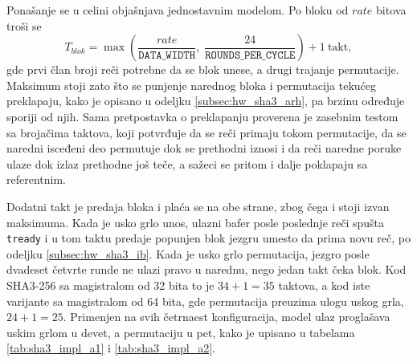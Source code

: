 \begin{table}[H]
\caption{Izmerena vrednost bita po taktu i propusnost izvedena iz nje pri $F_{max}$ iz tabela \ref{tab:sha3_impl_a1} i \ref{tab:sha3_impl_a2}}
\centering
{}
\label{tab:sha3_bpc}
\end{table}

Ponašanje se u celini objašnjava jednostavnim modelom. Po bloku od $rate$ bitova troši se
\begin{equation}
    T_{blok} = \max\!\left(\frac{rate}{\texttt{DATA\_WIDTH}},\; \frac{24}{\texttt{ROUNDS\_PER\_CYCLE}}\right) + 1 \ \text{takt},
    \label{eq:sha3_model}
\end{equation}
gde prvi član broji reči potrebne da se blok unese, a drugi trajanje permutacije. Maksimum stoji zato što se punjenje narednog bloka i permutacija tekućeg preklapaju, kako je opisano u odeljku \ref{subsec:hw_sha3_arh}, pa brzinu određuje sporiji od njih. Sama pretpostavka o preklapanju proverena je zasebnim testom sa brojačima taktova, koji potvrđuje da se reči primaju tokom permutacije, da se naredni isceđeni deo permutuje dok se prethodni iznosi i da reči naredne poruke ulaze dok izlaz prethodne još teče, a sažeci se pritom i dalje poklapaju sa referentnim.

Dodatni takt je predaja bloka i plaća se na obe strane, zbog čega i stoji izvan maksimuma. Kada je usko grlo unos, ulazni bafer posle poslednje reči spušta \texttt{tready} i u tom taktu predaje popunjen blok jezgru umesto da prima novu reč, po odeljku \ref{subsec:hw_sha3_ib}. Kada je usko grlo permutacija, jezgro posle dvadeset četvrte runde ne ulazi pravo u narednu, nego jedan takt čeka blok. Kod SHA3-256 sa magistralom od 32 bita to je $34 + 1 = 35$ taktova, a kod iste varijante sa magistralom od 64 bita, gde permutacija preuzima ulogu uskog grla, $24 + 1 = 25$. Primenjen na svih četrnaest konfiguracija, model ulaz proglašava uskim grlom u devet, a permutaciju u pet, kako je upisano u tabelama \ref{tab:sha3_impl_a1} i \ref{tab:sha3_impl_a2}.


